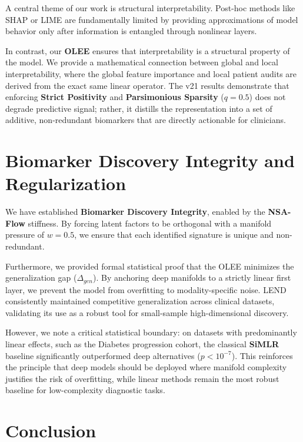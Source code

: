 \documentclass[
  letterpaper,
]{report}
\begin{document}
A central theme of our work is structural interpretability. Post-hoc
methods like SHAP or LIME are fundamentally limited by providing
approximations of model behavior only after information is entangled
through nonlinear layers.

In contrast, our \textbf{OLEE} ensures that interpretability is a
structural property of the model. We provide a mathematical connection
between global and local interpretability, where the global feature
importance and local patient audits are derived from the exact same
linear operator. The v21 results demonstrate that enforcing
\textbf{Strict Positivity} and \textbf{Parsimonious Sparsity}
(\(q=0.5\)) does not degrade predictive signal; rather, it distills the
representation into a set of additive, non-redundant biomarkers that are
directly actionable for clinicians.

\section{Biomarker Discovery Integrity and
Regularization}\label{biomarker-discovery-integrity-and-regularization}

We have established \textbf{Biomarker Discovery Integrity}, enabled by
the \textbf{NSA-Flow} stiffness. By forcing latent factors to be
orthogonal with a manifold pressure of \(w=0.5\), we ensure that each
identified signature is unique and non-redundant.

Furthermore, we provided formal statistical proof that the OLEE
minimizes the generalization gap (\(\Delta_{gen}\)). By anchoring deep
manifolds to a strictly linear first layer, we prevent the model from
overfitting to modality-specific noise. LEND consistently maintained
competitive generalization across clinical datasets, validating its use
as a robust tool for small-sample high-dimensional discovery.

However, we note a critical statistical boundary: on datasets with
predominantly linear effects, such as the Diabetes progression cohort,
the classical \textbf{SiMLR} baseline significantly outperformed deep
alternatives (\(p < 10^{-7}\)). This reinforces the principle that deep
models should be deployed where manifold complexity justifies the risk
of overfitting, while linear methods remain the most robust baseline for
low-complexity diagnostic tasks.

\section{Conclusion}\label{conclusion}
\end{document}
